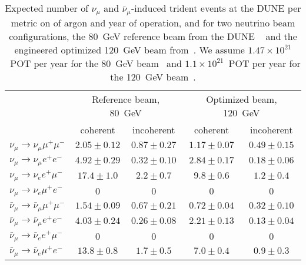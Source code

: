 \begin{table}[!b]
\begin{center}
\begin{tabular}{lcccc}
\toprule
& \multicolumn{2}{c}{Reference beam, 80~GeV} & \multicolumn{2}{c}{Optimized beam, 120~GeV} \\
& coherent & incoherent & coherent & incoherent \\
\midrule
$\nu_\mu \to \nu_\mu \mu^+\mu^-$ & $2.05 \pm 0.12$ & $0.87 \pm 0.27$ & $1.17 \pm 0.07$ & $0.49 \pm 0.15$ \\
$\nu_\mu \to \nu_\mu e^+e^-$ & $4.92 \pm 0.29$ & $0.32 \pm 0.10$ & $2.84 \pm 0.17$ & $0.18 \pm 0.06$\\
$\nu_\mu \to \nu_e e^+\mu^-$ & $17.4 \pm 1.0$ & $2.2 \pm 0.7$ & $9.8 \pm 0.6$ & $1.2 \pm 0.4$ \\
$\nu_\mu \to \nu_e \mu^+e^-$ & $0$ & $0$ & $0$ & $0$ \\
\midrule
$\bar\nu_\mu \to \bar\nu_\mu \mu^+\mu^-$ & $1.54 \pm 0.09$ & $0.67 \pm 0.21$ & $0.72 \pm 0.04$ & $0.32 \pm 0.10$ \\
$\bar\nu_\mu \to \bar\nu_\mu e^+e^-$ & $4.03 \pm 0.24$ & $0.26 \pm 0.08$ & $2.21 \pm 0.13$ & $0.13 \pm 0.04$ \\
$\bar\nu_\mu \to \bar\nu_e e^+\mu^-$ & $0$ & $0$ & $0$ & $0$ \\
$\bar\nu_\mu \to \bar\nu_e \mu^+e^-$ & $13.8 \pm 0.8$ & $1.7 \pm 0.5$ & $7.0 \pm 0.4$ & $0.9 \pm 0.3$ \\
\bottomrule
\end{tabular}
\end{center}
\caption[Expected number of  $\nu_\mu$ and $\bar\nu_\mu$-induced trident events at  per ton of argon and year of operation]{Expected number of   $\nu_\mu$ and $\bar\nu_\mu$-induced trident events at the DUNE   per metric on of argon and year of operation, and for two neutrino beam configurations, the 80~GeV reference beam from the DUNE ~\cite{Acciarri:2015uup} and the engineered optimized 120~GeV beam from~\cite{fields_doc_2901}. We assume $1.47 \times 10^{21}$~POT per year for the 80~GeV beam~\cite{Acciarri:2015uup} and  $1.1 \times 10^{21}$~POT per year for the 120~GeV beam~\cite{fields_doc_2901}.}
\label{tab:trident_rates}
\end{table}

